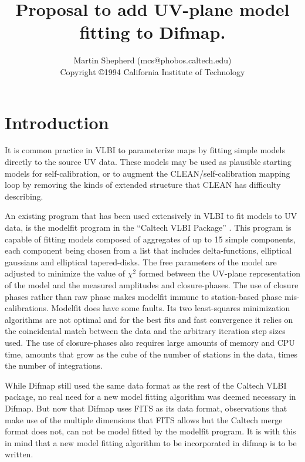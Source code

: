 \documentclass[11pt]{article}
\begin{document}
\title{Proposal to add UV-plane model fitting to Difmap.}

\author{Martin Shepherd (mcs@phobos.caltech.edu)\\
	Copyright \copyright 1994 California Institute of Technology}

\date{}
\maketitle

\clearpage

\section{Introduction}

It is common practice in VLBI to parameterize maps by fitting simple
models directly to the source UV data. These models may be used as
plausible starting models for self-calibration, or to augment the
CLEAN/self-calibration mapping loop by removing the kinds of extended
structure that CLEAN has difficulty describing.

An existing program that has been used extensively in VLBI to fit
models to UV data, is the modelfit program in the ``Caltech VLBI
Package'' \cite{tjp91}. This program is capable of fitting models
composed of aggregates of up to 15 simple components, each component
being chosen from a list that includes delta-functions, elliptical
gaussians and elliptical tapered-disks. The free parameters of the
model are adjusted to minimize the value of $\chi^{2}$ formed between
the UV-plane representation of the model and the measured amplitudes
and closure-phases. The use of closure phases rather than raw phase
makes modelfit immune to station-based phase mis-calibrations.
Modelfit does have some faults. Its two least-squares minimization
algorithms are not optimal and for the best fits and fast convergence
it relies on the coincidental match between the data and the arbitrary
iteration step sizes used. The use of closure-phases also requires
large amounts of memory and CPU time, amounts that grow as the cube of
the number of stations in the data, times the number of integrations.

While Difmap still used the same data format as the rest of the
Caltech VLBI package, no real need for a new model fitting algorithm
was deemed necessary in Difmap. But now that Difmap uses FITS as its
data format, observations that make use of the multiple dimensions
that FITS allows but the Caltech merge format does not, can not be
model fitted by the modelfit program. It is with this in mind that a
new model fitting algorithm to be incorporated in difmap is to be
written.
\end{document}
